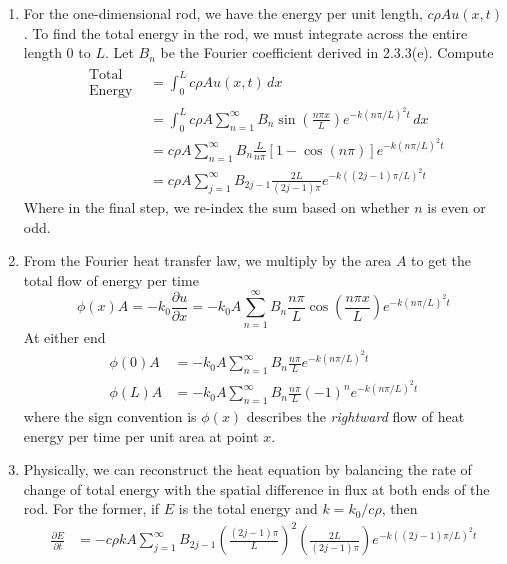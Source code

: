 \documentclass[a4paper]{article}
\begin{document}
\begin{enumerate}[label=(\alph*)]
	\item For the one-dimensional rod, we have the energy per unit length, \( c \rho A u \!\left( x,t \right) \). To find the total energy in the rod, we must integrate across the entire length \( 0 \) to \( L \). Let \( B_{n} \) be the Fourier coefficient derived in 2.3.3(e). Compute
	\begin{align*}
		\substack{\text{Total} \\ \text{Energy}} & = \int^{L}_{0} c \rho A u \!\left( x,t \right) \, dx \\
							 & = \int^{L}_{0} c \rho A \sum^{\infty}_{n=1} B_{n}\sin\!\left(\frac{n \pi x}{L}\right)e^{-k \!\left( n \pi / L \right)^{2}t} \, dx \\
							 & = c \rho A \sum^{\infty}_{n=1} B_{n}\frac{L}{n \pi} \!\left[ 1 - \cos\!\left(n \pi\right) \right]e^{-k \!\left( n \pi / L \right)^{2}t} \\
							 & = c \rho A \sum^{\infty}_{j=1} B_{2j-1}\frac{2L}{\!\left( 2j - 1 \right)\pi}e^{-k \!\left( \!\left( 2j - 1 \right)\pi / L \right)^{2}t}
	\end{align*}
	Where in the final step, we re-index the sum based on whether \( n \) is even or odd.
	\item From the Fourier heat transfer law, we multiply by the area \( A \) to get the total flow of energy per time
	\[
		\phi \!\left( x \right)A = -k_{0} \frac{\partial u}{\partial x} = -k_{0} A \sum^{\infty}_{n=1} B_{n}\frac{n \pi}{L}\cos\!\left(\frac{n \pi x}{L}\right)e^{-k \!\left( n \pi / L \right)^{2}t} 
	\]
	At either end
	\begin{align*}
		\phi \!\left( 0 \right)A & = -k_{0}A \sum^{\infty}_{n=1} B_{n}\frac{n \pi}{L}e^{-k \!\left( n \pi / L \right)^{2}t} \\
		\phi \!\left( L \right)A & = -k_{0}A \sum^{\infty}_{n=1} B_{n}\frac{n \pi}{L}\!\left( -1 \right)^{n}e^{-k \!\left( n \pi / L \right)^{2}t}
	\end{align*}
	where the sign convention is \( \phi \!\left( x \right) \) describes the \textit{rightward} flow of heat energy per time per unit area at point \( x \).
	\item Physically, we can reconstruct the heat equation by balancing the rate of change of total energy with the spatial difference in flux at both ends of the rod. For the former, if \( E \) is the total energy and \( k = k_{0} / c \rho \), then
	\begin{align*}
		\frac{\partial E}{\partial t} & = -c \rho k A \sum^{\infty}_{j=1} B_{2j-1}\!\left( \frac{\!\left( 2j-1 \right)\pi}{L} \right)^{2}\!\left( \frac{2L}{\!\left( 2j-1 \right)\pi} \right)e^{-k \!\left( \!\left( 2j-1 \right)\pi / L \right)^{2}t} \\

\end{align*}
\end{enumerate}
\end{document}
